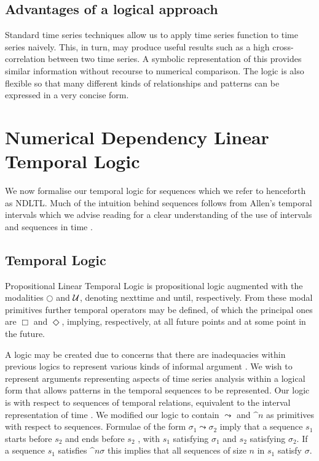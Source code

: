 \subsection{Advantages of a logical approach}


Standard time series techniques allow us to apply time series function
to time series naively. This, in turn, may produce useful results such
as a high cross-correlation between two time series. A symbolic
representation of this provides similar information without recourse
to numerical comparison. The logic is also flexible so that many
different kinds of relationships and patterns can be expressed in a
very concise form.


\section{Numerical Dependency Linear Temporal Logic}\label{sec:tl_ndltl}

We now formalise our temporal logic for sequences which we refer to
henceforth as NDLTL. Much of the intuition behind sequences follows
from Allen's temporal intervals which we advise reading for a clear
understanding of the use of intervals and sequences in time
\cite{all84}.

\subsection{Temporal Logic}
Propositional Linear Temporal Logic is propositional logic augmented
with the modalities $\bigcirc$ and ${\cal U}$, denoting nexttime and
until, respectively. From these modal primitives further temporal
operators may be defined, of which the principal ones are $\Box$ and
$\Diamond$, implying, respectively, at all future points and at some
point in the future. 

\medskip

A logic may be created due to concerns that there are inadequacies
within previous logics to represent various kinds of informal argument
\cite{haa78}. We wish to represent arguments representing aspects of
time series analysis within a logical form that allows patterns in the
temporal sequences to be represented. Our logic is with respect to
sequences of temporal relations, equivalent to the interval
representation of time \cite{all84}.
We modified our logic to contain $\leadsto$ and $\bm^n$ as primitives
with respect to sequences. Formulae of the form $\sigma_1 \leadsto
\sigma_2$ imply that a sequence $s_1$ starts before $s_2$ and
ends before $s_2$ , with $s_1$ satisfying $\sigma_1$ and $s_2$
satisfying $\sigma_2$. If a sequence $s_1$ satisfies $\bm^n \sigma$
this implies that all sequences of size $n$ in $s_1$ satisfy
$\sigma$. 


